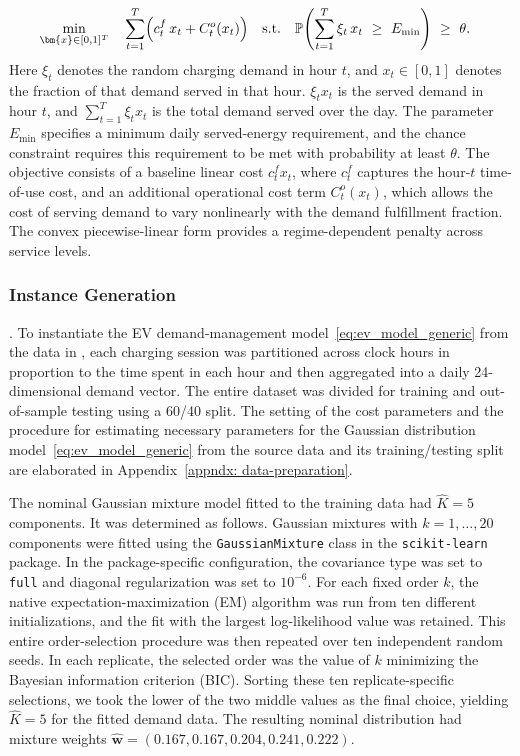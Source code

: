 \documentclass[opre,sglanonrev]{informs4}
\newcommand{\mbP}{\mathbb{P}}
\newcommand{\bw}{\bm{w}}
\newcommand{\bx}{\bm{x}}
\begin{document}
{\vspace{-1em}
\begin{equation}
\begin{aligned}
& \min_{\bx\in [0, 1]^T}\quad \sum_{t=1}^T\Bigl(c^f_t\,x_t + C^o_t(x_t)\Bigr)
\quad \mathrm{s.t.}\quad
\mbP\!\left(\sum_{t=1}^T \xi_t\,x_t\ \ge\ E_{\min}\right)\ \ge\ \theta.
\end{aligned}
\label{eq:ev_model_generic}
\end{equation}
Here \(\xi_t\) denotes the random charging demand in hour \(t\), and \(x_t\in[0,1]\) denotes the fraction of that demand served in that hour. \(\xi_t x_t\) is the served demand in hour \(t\), and \(\sum_{t=1}^T \xi_t x_t\) is the total demand served over the day. The parameter \(E_{\min}\) specifies a minimum daily served-energy requirement, and the chance constraint requires this requirement to be met with probability at least \(\theta\). The objective consists of a baseline linear cost \(c_t^f x_t\), where \(c_t^f\) captures the hour-\(t\) time-of-use cost, and an additional operational cost term \(C_t^o(x_t)\), which allows the cost of serving demand to vary nonlinearly with the demand fulfillment fraction. The convex piecewise-linear form provides a regime-dependent penalty across service levels.

\subsubsection{Instance Generation}. 
To instantiate the EV demand-management model~\eqref{eq:ev_model_generic} from the data in \cite{evcharging2025figshare}, each charging session was partitioned across clock hours in proportion to the time spent in each hour and then aggregated into a daily 24-dimensional demand vector.  The entire dataset was divided for training and out-of-sample testing using a 60/40 split. The setting of the cost parameters and the procedure for estimating necessary parameters for the Gaussian distribution model~\eqref{eq:ev_model_generic} from the source data and its training/testing split are elaborated in Appendix~\ref{appndx: data-preparation}.

 
 The nominal Gaussian mixture model fitted to the training data had $\hat{K} = 5$ components. It was determined as follows. Gaussian mixtures with \(k=1,\ldots,20\) components were fitted using the \texttt{GaussianMixture} class in the \texttt{scikit-learn} package. In the package-specific configuration, the covariance type was set to \texttt{full} and diagonal regularization was set to \(10^{-6}\). For each fixed order \(k\), the native expectation-maximization (EM) algorithm was run from ten different initializations, and the fit with the largest log-likelihood value was retained. This entire order-selection procedure was then repeated over ten independent random seeds. In each replicate, the selected order was the value of \(k\) minimizing the Bayesian information criterion (BIC). Sorting these ten replicate-specific selections, we took the lower of the two middle values as the final choice, yielding \(\hat K=5\) for the fitted demand data. The resulting nominal distribution had mixture weights \(\hat{\bw}=(0.167,0.167,0.204,0.241,0.222)\).

}
\end{document}
